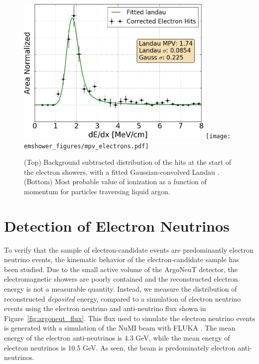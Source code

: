 \begin{figure}[htb]
  \centering
  \includegraphics[width=0.85\textwidth]{emshower_figures/fitted_electron_landau_trimmed.png}
  \texttt{[image: emshower\_figures/mpv\_electrons.pdf]}
  \caption[Background Subtracted Electron Landau Distribution]{(Top) Background subtracted distribution of the hits at the start of the electron showers, with a fitted Gaussian-convolved Landau .  (Bottom) Most probable value of ionization as a function of momentum for particles traversing liquid argon.}
  \label{fig:mpv_electrons}
 \end{figure} 

\FloatBarrier

\section{\label{sec:electrons} Detection of Electron Neutrinos}

To verify that the sample of electron-candidate events are predominantly electron neutrino events, the kinematic behavior of the electron-candidate sample has been studied.  Due to the small active volume of the ArgoNeuT detector, the electromagnetic showers are poorly contained and the reconstructed electron energy is not a measurable quantity.  Instead, we measure the distribution of reconstructed {\em deposited} energy, compared to a simulation of electron neutrino events using the electron neutrino and anti-neutrino flux shown in Figure~\ref{fig:argoneut_flux}.  This flux used to simulate the electron neutrino events is generated with a simulation of the NuMI beam with FLUKA \cite{Aliaga:2016oaz}.  The mean energy of the electron anti-neutrinos is 4.3 GeV, while the mean energy of electron neutrinos is 10.5 GeV.  As seen, the beam is predominately electron anti-neutrinos.

